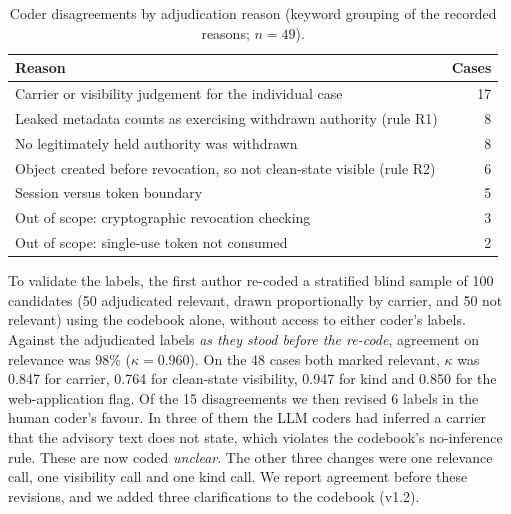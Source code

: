 \documentclass[preprint,12pt]{elsarticle}
\begin{document}
\begin{table}[t]
\centering\small
\caption{Coder disagreements by adjudication reason (keyword grouping of the recorded reasons; $n=49$).}
\label{tab:disagree}
\begin{tabular}{lr}
\toprule
Reason & Cases \\
\midrule
Carrier or visibility judgement for the individual case & 17 \\
Leaked metadata counts as exercising withdrawn authority (rule R1) & 8 \\
No legitimately held authority was withdrawn & 8 \\
Object created before revocation, so not clean-state visible (rule R2) & 6 \\
Session versus token boundary & 5 \\
Out of scope: cryptographic revocation checking & 3 \\
Out of scope: single-use token not consumed & 2 \\
\bottomrule
\end{tabular}
\end{table}
To validate the labels, the first author re-coded a stratified blind sample of 100 candidates
(50 adjudicated relevant, drawn proportionally by carrier, and 50 not relevant) using the codebook alone, without access
to either coder's labels. Against the adjudicated labels \emph{as they stood before the re-code}, agreement on relevance
was 98\% ($\kappa=0.960$). On the 48 cases both marked relevant, $\kappa$ was 0.847 for carrier, 0.764 for
clean-state visibility, 0.947 for kind and 0.850 for the web-application flag. Of the 15 disagreements we then
revised 6 labels in the human coder's favour. In three of them the LLM coders had inferred a carrier that the
advisory text does not state, which violates the codebook's no-inference rule. These are now coded \emph{unclear}.
The other three changes were one relevance call, one visibility call and one kind call. We report agreement before these revisions, and
we added three clarifications to the codebook (v1.2).
\end{document}
